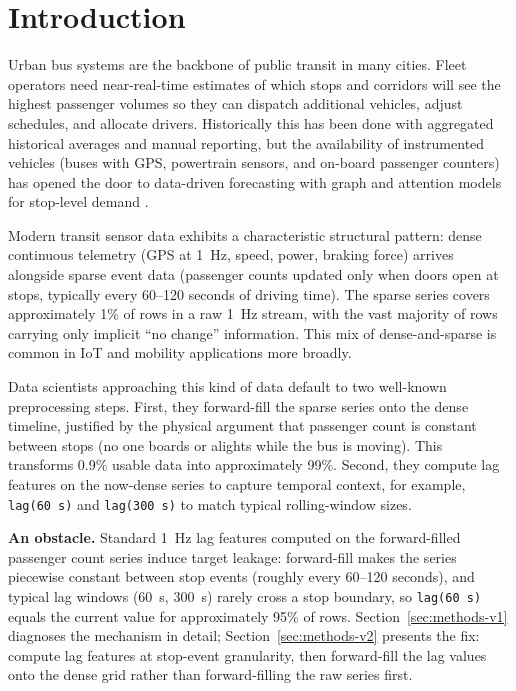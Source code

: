 \section{Introduction}
\label{sec:intro}

Urban bus systems are the backbone of public transit in many cities. Fleet
operators need near-real-time estimates of which stops and corridors will see
the highest passenger volumes so they can dispatch additional vehicles,
adjust schedules, and allocate drivers. Historically this has been done with
aggregated historical averages and manual reporting, but the availability of
instrumented vehicles (buses with GPS, powertrain sensors, and on-board
passenger counters) has opened the door to data-driven forecasting with
graph and attention models for stop-level demand \cite{li2023pagtsn}.

Modern transit sensor data exhibits a characteristic structural pattern:
dense continuous telemetry (GPS at 1~Hz, speed, power, braking force) arrives
alongside sparse event data (passenger counts updated only when doors open
at stops, typically every 60--120 seconds of driving time). The sparse
series covers approximately 1\% of rows in a raw 1~Hz stream, with the vast
majority of rows carrying only implicit ``no change'' information. This mix
of dense-and-sparse is common in IoT and mobility applications more broadly.

Data scientists approaching this kind of data default to two well-known
preprocessing steps. First, they forward-fill the sparse series onto the
dense timeline, justified by the physical argument that passenger count is
constant between stops (no one boards or alights while the bus is moving).
This transforms 0.9\% usable data into approximately 99\%. Second, they
compute lag features on the now-dense series to capture temporal context,
for example, \texttt{lag(60\,s)} and \texttt{lag(300\,s)} to match typical
rolling-window sizes.

\textbf{An obstacle.} Standard 1~Hz lag features computed on the
forward-filled passenger count series induce target leakage: forward-fill
makes the series piecewise constant between stop events (roughly every
60--120 seconds), and typical lag windows (60~s, 300~s) rarely cross a
stop boundary, so \texttt{lag(60\,s)} equals the current value for
approximately 95\% of rows. Section~\ref{sec:methods-v1} diagnoses the
mechanism in detail; Section~\ref{sec:methods-v2} presents the fix:
compute lag features at stop-event granularity, then forward-fill the
lag values onto the dense grid rather than forward-filling the raw
series first.

